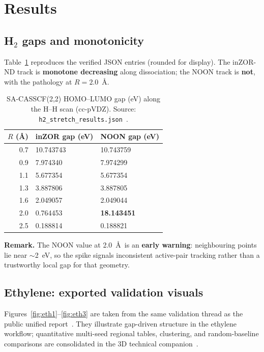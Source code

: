 \documentclass[11pt,a4paper]{article}
\begin{document}
\section{Results}

\subsection{H$_2$ gaps and monotonicity}
Table~\ref{tab:h2} reproduces the verified JSON entries (rounded for display).
The inZOR-ND track is \textbf{monotone decreasing} along dissociation; the NOON
track is \textbf{not}, with the pathology at $R=2.0$~\AA.

\begin{table}[htbp]
  \centering
  \caption{SA-CASSCF(2,2) HOMO--LUMO gap (eV) along the H--H scan (cc-pVDZ).
  Source: \texttt{h2\_stretch\_results.json}~\citep{inZORNDQCGaps2026}.}
  \label{tab:h2}
  \begin{tabular}{@{}rll@{}}
    \toprule
    $R$ (\AA) & inZOR gap (eV) & NOON gap (eV) \\
    \midrule
    0.7 & 10.743743 & 10.743759 \\
    0.9 & 7.974340  & 7.974299 \\
    1.1 & 5.677354  & 5.677354 \\
    1.3 & 3.887806  & 3.887805 \\
    1.6 & 2.049057  & 2.049044 \\
    2.0 & 0.764453  & \textbf{18.143451} \\
    2.5 & 0.188814  & 0.188821 \\
    \bottomrule
  \end{tabular}
\end{table}

\noindent\textbf{Remark.} The NOON value at 2.0~\AA\ is an \textbf{early warning}:
neighbouring points lie near $\sim$2~eV, so the spike signals inconsistent
active-pair tracking rather than a trustworthy local gap for that geometry.

\subsection{Ethylene: exported validation visuals}
Figures~\ref{fig:eth1}--\ref{fig:eth3} are taken from the same validation thread
as the public unified report~\citep{inZORNDQCGaps2026}. They illustrate
gap-driven structure in the ethylene workflow; quantitative multi-seed regional
tables, clustering, and random-baseline comparisons are consolidated in the 3D
technical companion~\citep{inZORNDEthylene3D2026}.
\end{document}
